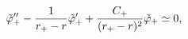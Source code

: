 \begin{equation}
{\tilde \varphi_+}''
- {1 \over {r_+-r}} {\tilde \varphi_+}'
+ {C_+ \over {(r_+-r)^2}}{\tilde \varphi_+}
\simeq 0,
\label{eq_approx_rp}
\end{equation}

